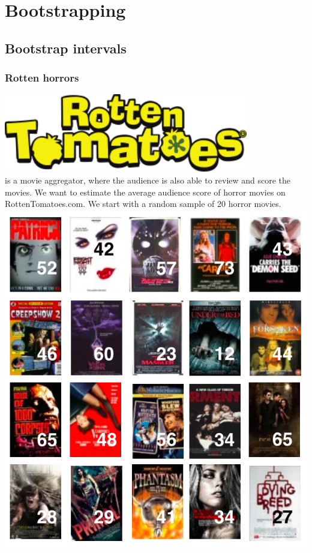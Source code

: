 \documentclass[11pt,containsverbatim,handout,xcolor=xelatex,dvipsnames,table]{beamer}
\begin{document}

\section{Bootstrapping}


\subsection{Bootstrap intervals}


\begin{frame}
\frametitle{Rotten horrors}

{
\includegraphics[width = 0.8\textwidth]{figures/movies/rotten_tomatoes} \\
is a movie aggregator, where the audience is also able to review and score the movies. We want to estimate the average audience score of horror movies on RottenTomatoes.com. We start with a random sample of 20 horror movies.
}
{
\includegraphics[width = \textwidth]{figures/movies/horror_data}
}

\end{frame}
\end{document}
